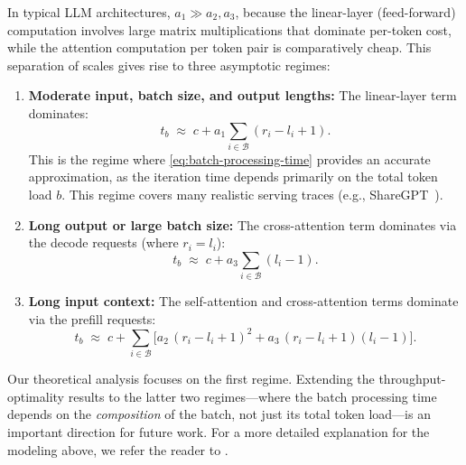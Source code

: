 \documentclass[11pt]{article}
\theoremstyle{plain}
\theoremstyle{definition}
\theoremstyle{remark}
\begin{document}
In typical LLM architectures, $a_1 \gg a_2, a_3$, because the linear-layer (feed-forward) computation involves large matrix multiplications that dominate per-token cost, while the attention computation per token pair is comparatively cheap. This separation of scales gives rise to three asymptotic regimes:
\begin{enumerate}
    \item \textbf{Moderate input, batch size, and output lengths:} The linear-layer term dominates:
    \[
        t_b \;\approx\; c + a_1 \sum_{i \in \mathcal{B}} (r_i - l_i + 1).
    \]
    This is the regime where \cref{eq:batch-processing-time} provides an accurate approximation, as the iteration time depends primarily on the total token load $b$. This regime covers many realistic serving traces (e.g., ShareGPT~\citep{sharegpt}).
    \item \textbf{Long output or large batch size:} The cross-attention term dominates via the decode requests (where $r_i = l_i$):
    \[
        t_b \;\approx\; c + a_3 \sum_{i \in \mathcal{B}} (l_i - 1).
    \]
    \item \textbf{Long input context:} The self-attention and cross-attention terms dominate via the prefill requests:
    \[
        t_b \;\approx\; c + \sum_{i \in \mathcal{B}} \bigl[a_2\,(r_i - l_i + 1)^2 + a_3\,(r_i - l_i + 1)(l_i - 1)\bigr].
    \]
\end{enumerate}

Our theoretical analysis focuses on the first regime. Extending the throughput-optimality results to the latter two regimes—where the batch processing time depends on the \emph{composition} of the batch, not just its total token load—is an important direction for future work. For a more detailed explanation for the modeling above, we refer the reader to \citet{bari2025optimal}.


\end{document}
